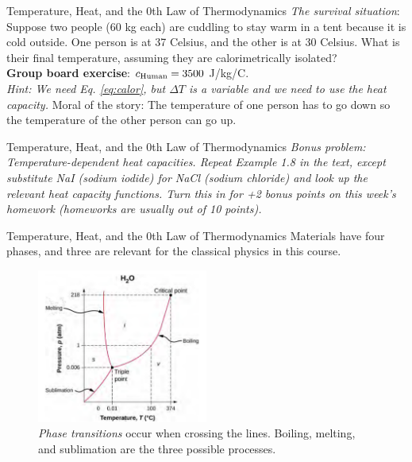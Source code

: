 \documentclass{beamer}
\begin{document}
\begin{frame}{Temperature, Heat, and the 0th Law of Thermodynamics}
\textit{The survival situation}: Suppose two people (60 kg each) are cuddling to stay warm in a tent because it is cold outside.  One person is at 37 Celsius, and the other is at 30 Celsius.  What is their final temperature, assuming they are calorimetrically isolated? \\ \vspace{0.5cm}
\textbf{Group board exercise}: $c_{\rm Human} = 3500$ J/kg/C. \\ \vspace{0.5cm}
\textit{Hint: We need Eq. \ref{eq:calor}, but $\Delta T$ is a variable and we need to use the heat capacity.}
\alert{Moral of the story}: The temperature of one person has to go down so the temperature of the other person can go up. 
\end{frame}

\begin{frame}{Temperature, Heat, and the 0th Law of Thermodynamics}
\textit{{Bonus problem}: Temperature-dependent heat capacities.  Repeat Example 1.8 in the text, except substitute NaI (sodium iodide) for NaCl (sodium chloride) and look up the relevant heat capacity functions.  Turn this in for +2 bonus points on this week's homework (homeworks are usually out of 10 points).}
\end{frame}

\begin{frame}{Temperature, Heat, and the 0th Law of Thermodynamics}
Materials have four phases, and three are relevant for the classical physics in this course.
\begin{figure}
\centering
\includegraphics[width=0.5\textwidth]{figures/PT.png}
\caption{\label{fig:pt} \textit{Phase transitions} occur when crossing the lines.  Boiling, melting, and sublimation are the three possible processes.}
\end{figure}
\end{frame}
\end{document}
